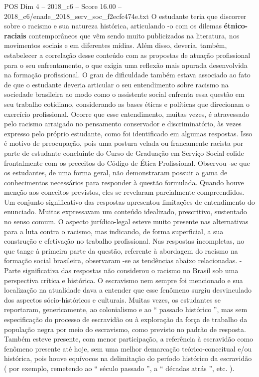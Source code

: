 \begin{textsample}{POS Dim 4 – 2018\_c6 – Score 16.00 – 2018\_c6/enade\_2018\_serv\_soc\_f2ecfc474e.txt}
O estudante teria que discorrer sobre o racismo e sua natureza histórica, articulando -o com os dilemas \textbf{étnico-raciais} contemporâneos que vêm sendo muito publicizados na literatura, nos movimentos sociais e em diferentes mídias.
Além disso, deveria, também, estabelecer a correlação desse conteúdo com as propostas de atuação profissional para o seu enfrentamento, o que exigia uma reflexão mais apurada desenvolvida na formação profissional.
O grau de dificuldade também estava associado ao fato de que o estudante deveria articular o seu entendimento sobre racismo na sociedade brasileira ao modo como o assistente social enfrenta essa questão em seu trabalho cotidiano, considerando as bases éticas e políticas que direcionam o exercício profissional.
Ocorre que esse entendimento, muitas vezes, é atravessado pelo racismo arraigado no pensamento conservador e discriminatório, às vezes expresso pelo próprio estudante, como foi identificado em algumas respostas.
Isso é motivo de preocupação, pois uma postura velada ou francamente racista por parte de estudante concluinte do Curso de Graduação em Serviço Social colide frontalmente com os preceitos do Código de Ética Profissional.
Observou -se que os estudantes, de uma forma geral, não demonstraram possuir a gama de conhecimentos necessários para responder à questão formulada.
Quando houve menção aos conceitos previstos, eles se revelaram parcialmente compreendidos.
Um conjunto significativo das respostas apresentou limitações de entendimento do enunciado.
Muitas expressavam um conteúdo idealizado, prescritivo, sustentado no senso comum.
O aspecto jurídico-legal esteve muito presente nas alternativas para a luta contra o racismo, mas indicando, de forma superficial, a sua construção e efetivação no trabalho profissional.
Nas respostas incompletas, no que tange à primeira parte da questão, referente à abordagem do racismo na formação social brasileira, observaram -se as tendências abaixo relacionadas. - Parte significativa das respostas não considerou o racismo no Brasil sob uma perspectiva crítica e histórica.
O escravismo nem sempre foi mencionado e sua localização na atualidade dava a entender que esse fenômeno surgiu desvinculado dos aspectos sócio-históricos e culturais.
Muitas vezes, os estudantes se reportaram, genericamente, ao colonialismo e ao “ passado histórico ”, mas sem especificação do processo de escravidão ou à exploração da força de trabalho da população negra por meio do escravismo, como previsto no padrão de resposta.
Também esteve presente, com menor participação, a referência à escravidão como fenômeno presente até hoje, sem uma melhor demarcação teórico-conceitual e/ou histórica, pois houve equívocos na delimitação do período histórico da escravidão ( por exemplo, remetendo ao “ século passado ”, a “ décadas atrás ”, etc. ).

\end{textsample}
